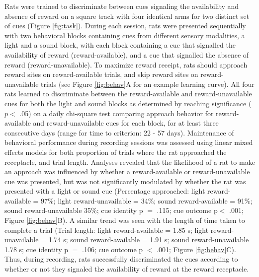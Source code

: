 \documentclass[11pt]{article}
\begin{document}
Rats were trained to discriminate between cues signaling the
availability and absence of reward on a square track with four
identical arms for two distinct set of cues (Figure
\ref{fig:task}). During each session, rats were presented sequentially
with two behavioral blocks containing cues from different sensory
modalities, a light and a sound block, with each block containing a
cue that signalled the availability of reward (reward-available), and
a cue that signalled the absence of reward (reward-unavailable). To
maximize reward receipt, rats should approach reward sites on
reward-available trials, and skip reward sites on reward-unavailable
trials (see Figure \ref{fig:behav}A for an example learning
curve). All four rats learned to discriminate between the
reward-available and reward-unavailable cues for both the light and
sound blocks as determined by reaching significance ($p <$ .05) on a
daily chi-square test comparing approach behavior for reward-available
and reward-unavailable cues for each block, for at least three
consecutive days (range for time to criterion: 22 - 57
days). Maintenance of behavioral performance during recording sessions
was assessed using linear mixed effects models for both proportion of
trials where the rat approached the receptacle, and trial
length. Analyses revealed that the likelihood of a rat to make an
approach was influenced by whether a reward-available or reward-unavailable cue was presented, but was not significantly modulated by whether the rat was presented with a light or sound cue (Percentage
approached: light reward-available = 97\%; light reward-unavailable =
34\%; sound reward-available = 91\%; sound reward-unavailable 35\%; cue identity p
$=$ .115; cue outcome p$<$ .001; Figure \ref{fig:behav}B). A similar trend was seen with the
length of time taken to complete a trial (Trial length: light
reward-available = 1.85 s; light reward-unavailable = 1.74 s; sound
reward-available = 1.91 s; sound reward-unavailable 1.78 s; cue identity p $=$ .106; cue outcome p $<$ .001; Figure \ref{fig:behav}C). Thus, during recording, rats successfully
discriminated the cues according to whether or not they signaled the
availability of reward at the reward receptacle.
\end{document}
